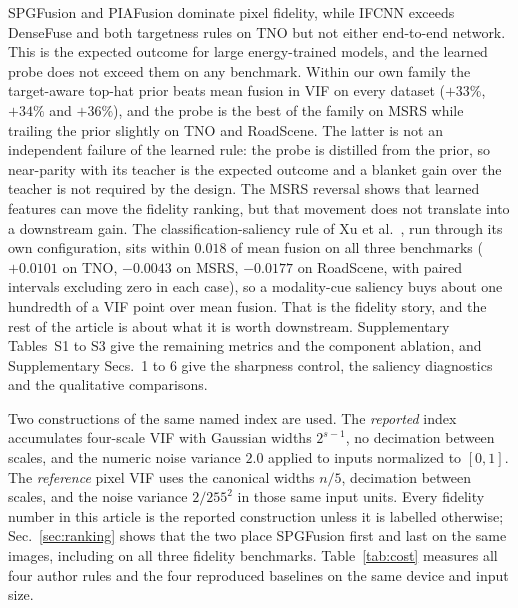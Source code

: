 \documentclass[journal]{IEEEtran}
\begin{document}
\begin{sloppypar}
SPGFusion and PIAFusion dominate pixel fidelity, while IFCNN exceeds DenseFuse and both
targetness rules on TNO but not either end-to-end network. This is the expected
outcome for large energy-trained models, and the learned probe does not exceed them on
any benchmark. Within our own family the target-aware top-hat prior beats mean fusion in VIF
on every dataset ($+33\%$, $+34\%$ and $+36\%$), and the probe is the best of the
family on MSRS while trailing the prior slightly on TNO and RoadScene. The latter is not
an independent failure of the learned rule: the probe is distilled from the prior, so
near-parity with its teacher is the expected outcome and a blanket gain over the teacher
is not required by the design. The MSRS reversal shows that learned features can move
the fidelity ranking, but that movement does not translate into a downstream gain. The
classification-saliency rule of Xu et al.~\cite{xu2021}, run through its own
configuration, sits within $0.018$ of mean fusion on all three benchmarks
($+0.0101$ on TNO, $-0.0043$ on MSRS, $-0.0177$ on RoadScene, with paired intervals
excluding zero in each case), so a modality-cue saliency buys about one hundredth of a
VIF point over mean fusion. That is the fidelity story, and the rest of the article is
about what it is worth downstream. Supplementary Tables~S1 to S3 give the remaining
metrics and the component ablation, and Supplementary Secs.~1 to 6
give the sharpness control, the saliency diagnostics and the qualitative comparisons.

Two constructions of the same named index are used. The \emph{reported} index
accumulates four-scale VIF with Gaussian widths $2^{s-1}$, no decimation between scales,
and the numeric noise variance $2.0$ applied to inputs normalized to $[0,1]$. The
\emph{reference} pixel VIF uses the canonical widths $n/5$, decimation between scales,
and the noise variance $2/255^2$ in those same input units. Every fidelity number in
this article is the reported construction unless it is labelled otherwise;
Sec.~\ref{sec:ranking} shows that the two place SPGFusion first and last on the same
images, including on all three fidelity benchmarks. Table~\ref{tab:cost} measures all
four author rules and the four reproduced baselines on the same device and input size.

\begin{table}[!t]\centering\footnotesize


\end{table}
\end{sloppypar}
\end{document}
